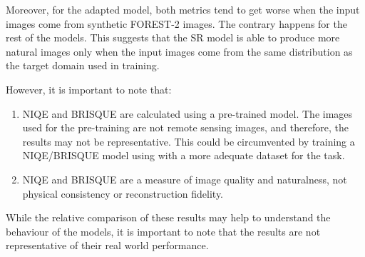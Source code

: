     Moreover, for the adapted model, both metrics tend to get worse when the input images come from synthetic FOREST-2 images. The contrary happens for the rest of the models.
    This suggests that the SR model is able to produce more natural images only when the input images come from the same distribution as the target domain used in training.
    
    However, it is important to note that: 

    \begin{enumerate}
        \item NIQE and BRISQUE are calculated using a pre-trained model. The images used for the pre-training are not remote sensing images, and therefore, the results may not be representative. This could be circumvented by training a NIQE/BRISQUE model using with a more adequate dataset for the task.
        \item NIQE and BRISQUE are a measure of image quality and naturalness, not physical consistency or reconstruction fidelity.
    \end{enumerate}

    While the relative comparison of these results may help to understand the behaviour of the models, it is important to note that the results are not representative of their real world performance. 

        
\newpage
    